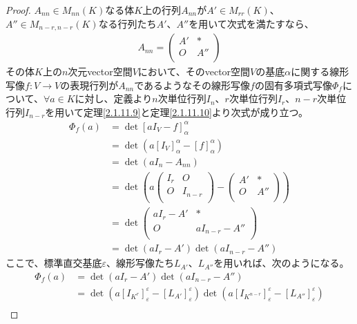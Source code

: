 \documentclass[dvipdfmx]{jsarticle}
\begin{document}
\begin{proof}
$A_{nn} \in M_{nn}(K)$なる体$K$上の行列$A_{nn}$が$A' \in M_{rr}(K)$、$A'' \in M_{n - r,n - r}(K)$なる行列たち$A'$、$A''$を用いて次式を満たすなら、
\begin{align*}
A_{nn} = \begin{pmatrix}
A' & * \\
O & A'' \\
\end{pmatrix}
\end{align*}
その体$K$上の$n$次元vector空間$V$において、そのvector空間$V$の基底$\alpha$に関する線形写像$f:V \rightarrow V$の表現行列が$A_{nn}$であるようなその線形写像$f$の固有多項式写像$\varPhi_{f}$について、$\forall a \in K$に対し、定義より$n$次単位行列$I_{n}$、$r$次単位行列$I_{r}$、$n - r$次単位行列$I_{n - r}$を用いて定理\ref{2.1.11.9}と定理\ref{2.1.11.10}より次式が成り立つ。
\begin{align*}
\varPhi_{f}(a) &= \det\left[ aI_{V} - f \right]_{\alpha}^{\alpha}\\
&= \det\left( a\left[ I_{V} \right]_{\alpha}^{\alpha} - [ f]_{\alpha}^{\alpha} \right)\\
&= \det\left( aI_{n} - A_{nn} \right)\\
&= \det\left( a\begin{pmatrix}
I_{r} & O \\
O & I_{n - r} \\
\end{pmatrix} - \begin{pmatrix}
A' & * \\
O & A'' \\
\end{pmatrix} \right)\\
&= \det\begin{pmatrix}
aI_{r} - A' & * \\
O & aI_{n - r} - A'' \\
\end{pmatrix}\\
&= \det\left( aI_{r} - A' \right)\det\left( aI_{n - r} - A'' \right)
\end{align*}
ここで、標準直交基底$\varepsilon$、線形写像たち$L_{A'}$、$L_{A''}$を用いれば、次のようになる。
\begin{align*}
\varPhi_{f}(a) &= \det\left( aI_{r} - A' \right)\det\left( aI_{n - r} - A'' \right)\\
&= \det\left( a\left[ I_{K^{r}} \right]_{\varepsilon}^{\varepsilon} - \left[ L_{A'} \right]_{\varepsilon}^{\varepsilon} \right)\det\left( a\left[ I_{K^{n - r}} \right]_{\varepsilon}^{\varepsilon} - \left[ L_{A''} \right]_{\varepsilon}^{\varepsilon} \right)\\

\end{align*}
\end{proof}
\end{document}
